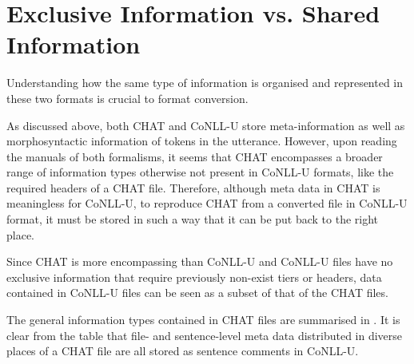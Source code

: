 
\section{Exclusive Information vs. Shared Information}
Understanding how the same type of information is organised and represented in these two formats is crucial to format conversion.

As discussed above, both CHAT and CoNLL-U store meta-information as well as morphosyntactic information of tokens in the utterance. However, upon reading the manuals of both formalisms, it seems that CHAT encompasses a broader range of information types otherwise not present in CoNLL-U formats, like the required headers of a CHAT file. Therefore, although meta data in CHAT is meaningless for CoNLL-U, to reproduce CHAT from a converted file in CoNLL-U format, it must be stored in such a way that it can be put back to the right place.

Since CHAT is more encompassing than CoNLL-U and CoNLL-U files have no exclusive information that require previously non-exist tiers or headers, data contained in CoNLL-U files can be seen as a subset of that of the CHAT files.

The general information types contained in CHAT files are summarised in . It is clear from the table that file- and sentence-level meta data distributed in diverse places of a CHAT file are all stored as sentence comments in CoNLL-U.
\clearpage

